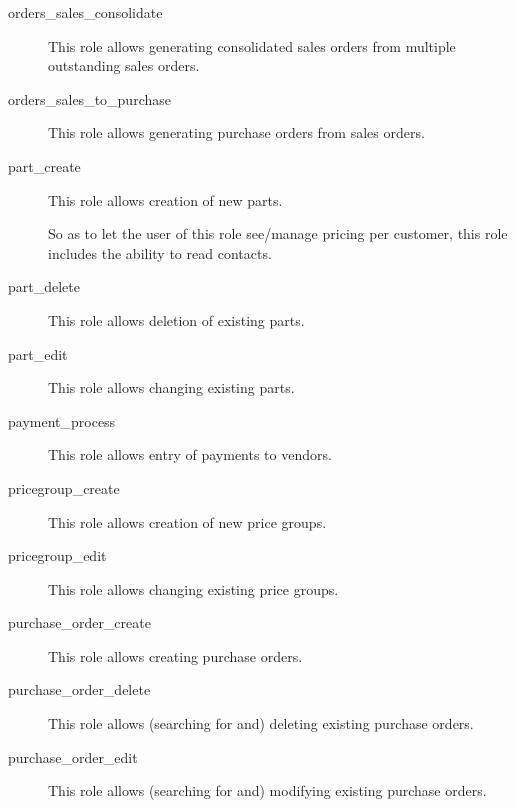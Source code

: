 \begin{description}
\item [orders\_sales\_consolidate] \htmlspacing 
                         This role allows generating consolidated sales
                         orders from multiple outstanding sales orders.
\item [orders\_sales\_to\_purchase] \htmlspacing 
                         This role allows generating purchase orders
                         from sales orders.
\item [part\_create] \htmlspacing 
                         This role allows creation of new parts.

                         So as to let the user of this role see/manage pricing per customer, this role includes
                         the ability to read contacts.
\item [part\_delete] \htmlspacing 
                         This role allows deletion of existing parts.
\item [part\_edit] \htmlspacing 
                         This role allows changing existing parts.
\item [payment\_process] \htmlspacing 
                         This role allows entry of payments to vendors.
\item [pricegroup\_create] \htmlspacing 
                         This role allows creation of new price groups.
\item [pricegroup\_edit] \htmlspacing 
                         This role allows changing existing price groups.
\item [purchase\_order\_create] \htmlspacing 
                         This role allows creating purchase orders.
\item [purchase\_order\_delete] \htmlspacing 
                         This role allows (searching for and) deleting existing purchase orders.
\item [purchase\_order\_edit] \htmlspacing 
                         This role allows (searching for and) modifying existing purchase orders.

\end{description}
